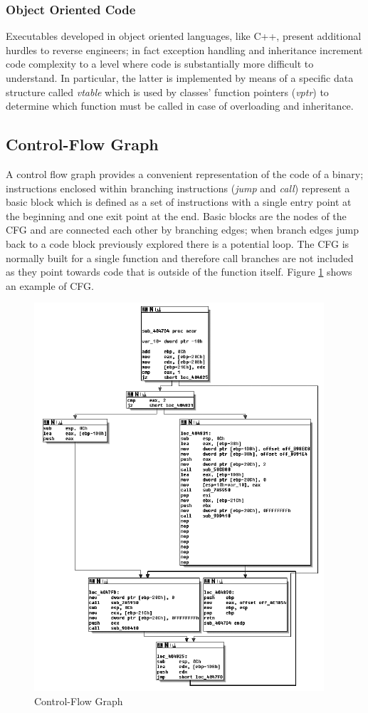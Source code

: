 \subsubsection{Object Oriented Code}
Executables developed in object oriented languages, like C++, present additional hurdles to reverse engineers; in fact
exception handling and inheritance increment code complexity to a level where code is substantially more difficult to
understand. In particular, the latter is implemented by means of a specific data structure called \textit{vtable} which
is used by classes' function pointers (\textit{vptr}) to determine which function must be called in case of overloading
and inheritance.


\subsection{Control-Flow Graph}
A control flow graph provides a convenient representation of the code of a binary; instructions enclosed within
branching instructions (\textit{jump} and \textit{call}) represent a basic block which is defined as a set of
instructions with a single entry point at the beginning and one exit point at the end. Basic blocks are the nodes of the
CFG and are connected each other by branching edges; when branch edges jump back to a code block previously explored
there is a potential loop. The CFG is normally built for a single function and therefore call branches are not included
as they point towards code that is outside of the function itself. Figure \ref{CFG} shows an example of CFG.

\begin{figure}[!htbp]
    \begin{center}
        \includegraphics{./pics/CFG.png}
        \caption{Control-Flow Graph}
        \label{CFG}
    \end{center}
\end{figure}


